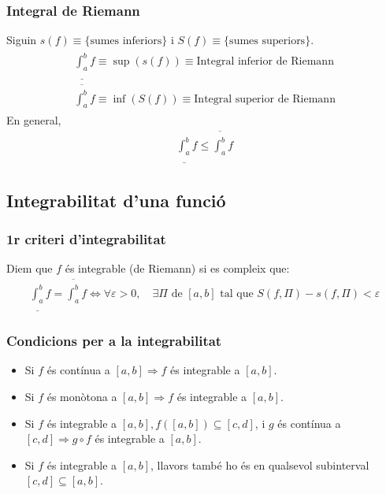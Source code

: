 \subsubsection*{Integral de Riemann}
Siguin $s(f) \equiv \{ \text{sumes inferiors} \}$ i $S(f) \equiv \{ \text{sumes superiors} \}$.
\begin{align}
\begin{gathered}
    \underline{\int_{a}^{b}} f \equiv \sup (s(f)) \equiv \text{Integral inferior de Riemann} \\ 
    \overline{\int_{a}^{b}} f \equiv \inf (S(f)) \equiv \text{Integral superior de Riemann}
\end{gathered}
\end{align}
En general,
\begin{align}
    \underline{\int_{a}^{b}} f \leq \overline{\int_{a}^{b}} f
\end{align}

\subsection{Integrabilitat d'una funció}
\subsubsection*{1r criteri d'integrabilitat}
Diem que $f$ és integrable (de Riemann) si es compleix que:
\begin{align}
    \underline{\int_{a}^{b}} f = \overline{\int_{a}^{b}} f \Leftrightarrow \forall \varepsilon > 0, \quad \exists \Pi \text{ de } [a , b] \text{ tal que } S(f , \Pi) - s(f , \Pi) < \varepsilon
\end{align}
\subsubsection*{Condicions per a la integrabilitat}
\begin{itemize}
    \item Si $f$ és contínua a $[a , b] \Rightarrow f$ és integrable a $[a , b]$.
    \item Si $f$ és monòtona a $[a , b] \Rightarrow f$ és integrable a $[a , b]$.
    \item Si $f$ és integrable a $[a , b] , f([a , b]) \subseteq [c , d]$, i $g$ és contínua a $[c , d] \Rightarrow g \circ f$ és integrable a $[a , b]$.
    \item Si $f$ és integrable a $[a , b]$, llavors també ho és en qualsevol subinterval $[c , d] \subseteq [a , b]$.
\end{itemize}

